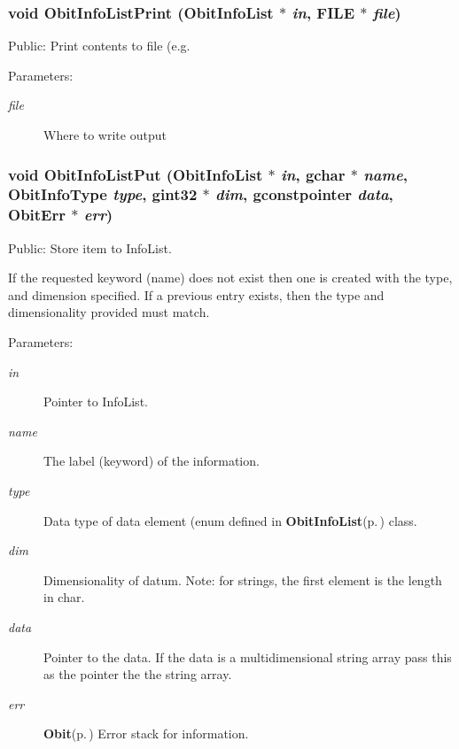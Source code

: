 \subsubsection{\setlength{\rightskip}{0pt plus 5cm}void Obit\-Info\-List\-Print ({\bf Obit\-Info\-List} $\ast$ {\em in}, FILE $\ast$ {\em file})}\label{ObitInfoList_8h_a20}


Public: Print contents to file (e.g. 

\begin{Desc}
\item[Parameters:]
\begin{description}
\item[{\em file}]Where to write output \end{description}
\end{Desc}
\subsubsection{\setlength{\rightskip}{0pt plus 5cm}void Obit\-Info\-List\-Put ({\bf Obit\-Info\-List} $\ast$ {\em in}, gchar $\ast$ {\em name}, Obit\-Info\-Type {\em type}, gint32 $\ast$ {\em dim}, gconstpointer {\em data}, {\bf Obit\-Err} $\ast$ {\em err})}\label{ObitInfoList_8h_a10}


Public: Store item to Info\-List. 

If the requested keyword (name) does not exist then one is created with the type, and dimension specified. If a previous entry exists, then the type and dimensionality provided must match. \begin{Desc}
\item[Parameters:]
\begin{description}
\item[{\em in}]Pointer to Info\-List. \item[{\em name}]The label (keyword) of the information. \item[{\em type}]Data type of data element (enum defined in {\bf Obit\-Info\-List}{\rm (p.\,\pageref{structObitInfoList})} class. \item[{\em dim}]Dimensionality of datum. Note: for strings, the first element is the length in char. \item[{\em data}]Pointer to the data. If the data is a multidimensional string array pass this as the pointer the the string array. \item[{\em err}]{\bf Obit}{\rm (p.\,\pageref{structObit})} Error stack for information. \end{description}
\end{Desc}
